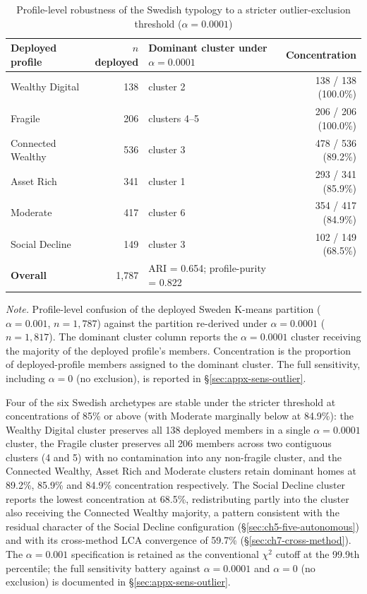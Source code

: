 \begin{table}[!htbp]
\centering
\caption[Swedish typology robustness to stricter outlier threshold]{Profile-level robustness of the Swedish typology to a stricter outlier-exclusion threshold ($\alpha = 0.0001$)}
\label{tab:ch7-outlier-robustness}
\small
\setlength{\tabcolsep}{4pt}
\begin{tabular}{@{}lrlr@{}}
\toprule
\textbf{Deployed profile} & \textbf{$n$ deployed} & \textbf{Dominant cluster under $\alpha = 0.0001$} & \textbf{Concentration} \\
\midrule
Wealthy Digital     & 138 & cluster 2     & 138 / 138 (100.0\%) \\
Fragile             & 206 & clusters 4--5 & 206 / 206 (100.0\%) \\
Connected Wealthy   & 536 & cluster 3     & 478 / 536 (89.2\%)  \\
Asset Rich          & 341 & cluster 1     & 293 / 341 (85.9\%)  \\
Moderate            & 417 & cluster 6     & 354 / 417 (84.9\%)  \\
Social Decline      & 149 & cluster 3     & 102 / 149 (68.5\%)  \\
\midrule
\textbf{Overall} & 1{,}787 & \multicolumn{1}{l}{ARI = 0.654; profile-purity = 0.822} & \\
\bottomrule
\end{tabular}
\par\medskip
\begin{minipage}{\linewidth}
\footnotesize\textit{Note.} Profile-level confusion of the deployed Sweden K-means partition ($\alpha = 0.001$, $n = 1{,}787$) against the partition re-derived under $\alpha = 0.0001$ ($n = 1{,}817$). The dominant cluster column reports the $\alpha = 0.0001$ cluster receiving the majority of the deployed profile's members. Concentration is the proportion of deployed-profile members assigned to the dominant cluster. The full sensitivity, including $\alpha = 0$ (no exclusion), is reported in \S\ref{sec:appx-sens-outlier}.
\end{minipage}
\end{table}

Four of the six Swedish archetypes are stable under the stricter threshold at concentrations of 85\% or above (with Moderate marginally below at 84.9\%): the Wealthy Digital cluster preserves all 138 deployed members in a single $\alpha = 0.0001$ cluster, the Fragile cluster preserves all 206 members across two contiguous clusters (4 and 5) with no contamination into any non-fragile cluster, and the Connected Wealthy, Asset Rich and Moderate clusters retain dominant homes at 89.2\%, 85.9\% and 84.9\% concentration respectively. The Social Decline cluster reports the lowest concentration at 68.5\%, redistributing partly into the cluster also receiving the Connected Wealthy majority, a pattern consistent with the residual character of the Social Decline configuration (\S\ref{sec:ch5-five-autonomous}) and with its cross-method LCA convergence of 59.7\% (\S\ref{sec:ch7-cross-method}). The $\alpha = 0.001$ specification is retained as the conventional $\chi^2$ cutoff at the 99.9th percentile; the full sensitivity battery against $\alpha = 0.0001$ and $\alpha = 0$ (no exclusion) is documented in \S\ref{sec:appx-sens-outlier}.

